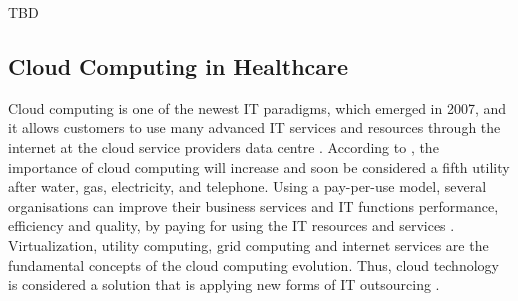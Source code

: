 TBD

\subsection{Cloud Computing in Healthcare}

Cloud computing is one of the newest IT paradigms, which emerged in 2007, and it allows customers to use many advanced IT services and resources through the internet at the cloud service providers data centre \cite{Sultan2014}. According to \citet{Buyya2009}, the importance of cloud computing will increase and soon be considered a fifth utility after water, gas, electricity, and telephone. Using a pay-per-use model, several organisations can improve their business services and IT functions performance, efficiency and quality, by paying for using the IT resources and services \cite{Abdollahzadehgan2013}. Virtualization, utility computing, grid computing and internet services are the fundamental concepts of the cloud computing evolution. Thus, cloud technology is considered a solution that is applying new forms of IT outsourcing \cite{tashkandi2015cloud,Chang2013}.

